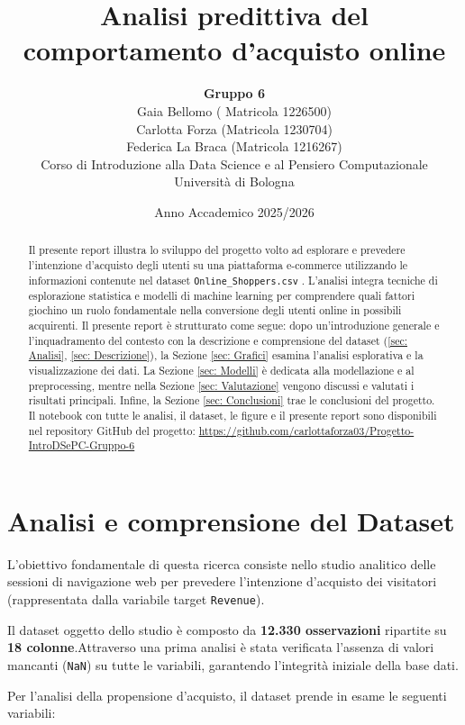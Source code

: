 \documentclass[11pt,a4paper]{article}
\title{\textbf{Analisi predittiva del comportamento d'acquisto online}}
\author{
    \textbf{Gruppo 6} \\
    Gaia Bellomo ( Matricola 1226500) \\
    Carlotta Forza (Matricola 1230704) \\
    Federica La Braca (Matricola 1216267) \\
    \makeatletter
    \small Corso di Introduzione alla Data Science e al Pensiero Computazionale \\
    \small Università di Bologna
}
\date{Anno Accademico 2025/2026}
\begin{document}
\maketitle

\begin{abstract}
Il presente report illustra lo sviluppo del progetto volto ad esplorare e prevedere l'intenzione d'acquisto degli utenti su una piattaforma e-commerce utilizzando le informazioni contenute nel dataset \texttt{Online\_Shoppers.csv} \citep{online_shoppers_dataset}. L'analisi integra tecniche di esplorazione statistica e modelli di machine learning per comprendere quali fattori giochino un ruolo fondamentale nella conversione degli utenti online in possibili acquirenti. Il presente report è strutturato come segue: dopo un'introduzione generale e l'inquadramento del contesto con la descrizione e comprensione del dataset (\ref{sec: Analisi}, \ref{sec: Descrizione}), la Sezione \ref{sec: Grafici} esamina l'analisi esplorativa e la visualizzazione dei dati. La Sezione \ref{sec: Modelli} è dedicata alla modellazione e al preprocessing, mentre nella Sezione \ref{sec: Valutazione} vengono discussi e valutati i risultati principali. Infine, la Sezione \ref{sec: Conclusioni} trae le conclusioni del progetto.
Il notebook con tutte le analisi, il dataset, le figure e il presente report sono disponibili nel repository GitHub del progetto: \url{https://github.com/carlottaforza03/Progetto-IntroDSePC-Gruppo-6} 


\end{abstract}

\tableofcontents
\clearpage

\section{Analisi e comprensione del Dataset}
\label{sec: Analisi}
L'obiettivo fondamentale di questa ricerca consiste nello studio analitico delle sessioni di navigazione web per prevedere l'intenzione d'acquisto dei visitatori (rappresentata dalla variabile target \texttt{Revenue}).

Il dataset oggetto dello studio è composto da \textbf{12.330 osservazioni} ripartite su \textbf{18 colonne}.Attraverso una prima analisi è stata verificata l'assenza di valori mancanti (\texttt{NaN}) su tutte le variabili, garantendo l'integrità iniziale della base dati.

Per l'analisi della propensione d'acquisto, il dataset prende in esame le seguenti variabili:
\end{document}
